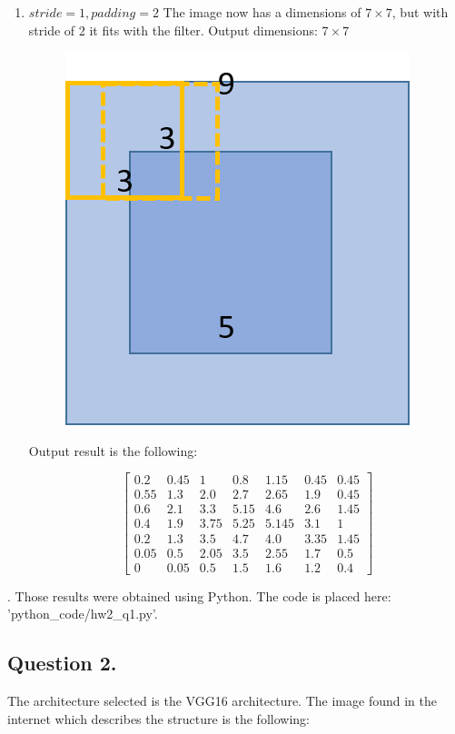 \documentclass[a4paper]{iacas}
\begin{document}
\begin{enumerate}
\item $stride = 1, padding = 2$
The image now has a dimensions of $7\times7$, but with stride of 2 it fits with the filter. Output dimensions: $7\times7$
\vskip 0.1in
\begin{figure}
	\includegraphics[scale=0.8]{imgs/q_1_32.png}
\end{figure}
\vskip 0.1in

Output result is the following:

\begin{equation*}
\left[
\begin{matrix}
0.2 & 0.45 & 1 & 0.8 & 1.15 & 0.45 & 0.45 \\
0.55 & 1.3 & 2.0 & 2.7 & 2.65 & 1.9 & 0.45 \\
0.6 & 2.1 & 3.3 & 5.15 & 4.6 & 2.6 & 1.45\\
0.4 & 1.9 & 3.75 & 5.25 & 5.145 & 3.1 & 1 \\
0.2 & 1.3 & 3.5 & 4.7 & 4.0 & 3.35 & 1.45\\
0.05 & 0.5 & 2.05 & 3.5 & 2.55 & 1.7 & 0.5 \\ 
0 & 0.05 & 0.5 & 1.5 & 1.6 & 1.2 & 0.4
\end{matrix}
\right]
\end{equation*}
\end{enumerate}.
Those results were obtained using Python. The code is placed here: 'python\_code/hw2\_q1.py'.


\newpage
\subsection{Question 2.}
The architecture selected is the VGG16 architecture. The image found in the internet which describes the structure is the following:
\end{document}
